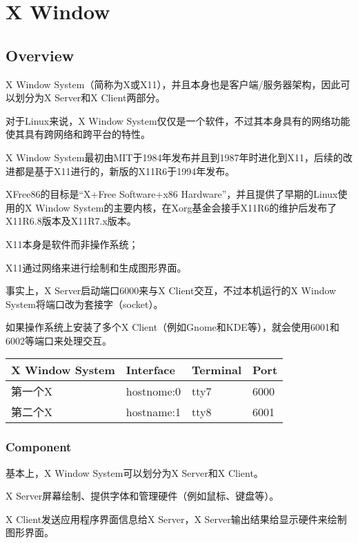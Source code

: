 \part{X Window}


\chapter{Overview}

X Window System（简称为X或X11），并且本身也是客户端/服务器架构，因此可以划分为X Server和X Client两部分。

对于Linux来说，X Window System仅仅是一个软件，不过其本身具有的网络功能使其具有跨网络和跨平台的特性。

X Window System最初由MIT于1984年发布并且到1987年时进化到X11，后续的改进都是基于X11进行的，新版的X11R6于1994年发布。

XFree86的目标是“X+Free Software+x86 Hardware”，并且提供了早期的Linux使用的X Window System的主要内核，在Xorg基金会接手X11R6的维护后发布了X11R6.8版本及X11R7.x版本。

\begin{compactitem}
\item X11本身是软件而非操作系统；
\item X11通过网络来进行绘制和生成图形界面。
\end{compactitem}

事实上，X Server启动端口6000来与X Client交互，不过本机运行的X Window System将端口改为套接字（socket）。

如果操作系统上安装了多个X Client（例如Gnome和KDE等），就会使用6001和6002等端口来处理交互。

\begin{table}[htbp]
\centering
\begin{tabular}{|l|l|l|l|}
\hline
X Window System & Interface & Terminal & Port \\
\hline
第一个X & hostnome:0 & tty7 & 6000\\
\hline
第二个X & hostname:1 & tty8 & 6001\\
\hline
\end{tabular}
\end{table}



\section{Component}


基本上，X Window System可以划分为X Server和X Client。

\begin{compactitem}
\item X Server屏幕绘制、提供字体和管理硬件（例如鼠标、键盘等）。
\item X Client发送应用程序界面信息给X Server，X Server输出结果给显示硬件来绘制图形界面。
\end{compactitem}

